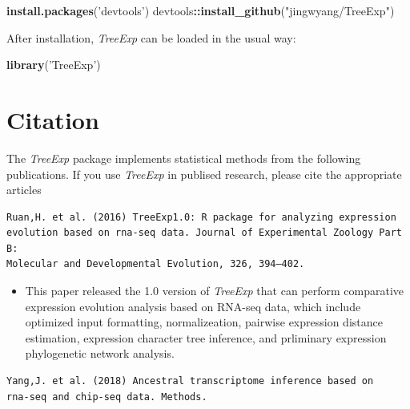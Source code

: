 \documentclass[]{book}
\newenvironment{Shaded}{\begin{snugshade}}{\end{snugshade}}
\newcommand{\KeywordTok}[1]{\textcolor[rgb]{0.13,0.29,0.53}{\textbf{#1}}}
\newcommand{\NormalTok}[1]{#1}
\newcommand{\OperatorTok}[1]{\textcolor[rgb]{0.81,0.36,0.00}{\textbf{#1}}}
\newcommand{\StringTok}[1]{\textcolor[rgb]{0.31,0.60,0.02}{#1}}
\providecommand{\tightlist}{%
  \setlength{\itemsep}{0pt}\setlength{\parskip}{0pt}}
\begin{document}
\begin{Shaded}
\begin{Highlighting}[]
\KeywordTok{install.packages}\NormalTok{(}\StringTok{'devtools'}\NormalTok{)}
\NormalTok{devtools}\OperatorTok{::}\KeywordTok{install_github}\NormalTok{(}\StringTok{"jingwyang/TreeExp"}\NormalTok{)}
\end{Highlighting}
\end{Shaded}

After installation, \emph{TreeExp} can be loaded in the usual way:

\begin{Shaded}
\begin{Highlighting}[]
\KeywordTok{library}\NormalTok{(}\StringTok{'TreeExp'}\NormalTok{)}
\end{Highlighting}
\end{Shaded}

\newpage

\hypertarget{citation}{%
\section{Citation}\label{citation}}

The \emph{TreeExp} package implements statistical methods from the following publications. If you use \emph{TreeExp} in publised research, please cite the appropriate articles

\begin{verbatim}
Ruan,H. et al. (2016) TreeExp1.0: R package for analyzing expression 
evolution based on rna-seq data. Journal of Experimental Zoology Part B: 
Molecular and Developmental Evolution, 326, 394–402.
\end{verbatim}

\begin{itemize}
\tightlist
\item
  This paper \citep{doi:10.1002/jez.b.22707} released the 1.0 version of \emph{TreeExp} that can perform comparative expression evolution analysis based on RNA-seq data, which include optimized input formatting, normalizeation, pairwise expression distance estimation, expression character tree inference, and prliminary expression phylogenetic network analysis.
\end{itemize}

\begin{verbatim}
Yang,J. et al. (2018) Ancestral transcriptome inference based on
rna-seq and chip-seq data. Methods.
\end{verbatim}
\end{document}
